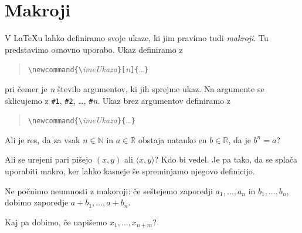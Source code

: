 \documentclass{amsart}
\begin{document}
\section{Makroji}
\label{sec:makroji}

V {\LaTeX}u lahko definiramo svoje ukaze, ki jim pravimo tudi \emph{makroji}. Tu
predstavimo osnovno uporabo. Ukaz definiramo z
%
\begin{quote}
  \verb|\newcommand{\|\emph{imeUkaza}\verb|}[|\emph{n}\verb|]{|\dots\verb|}|
\end{quote}
%
pri čemer je \emph{n} število argumentov, ki jih sprejme ukaz. Na argumente se sklicujemo
z \verb|#1|, \verb|#2|, \dots, \verb|#|\emph{n}. Ukaz brez argumentov definiramo z
%
\begin{quote}
  \verb|\newcommand{\|\emph{imeUkaza}\verb|}{|\dots\verb|}|
\end{quote}
%


\newcommand{\RR}{\mathbb{R}} %
\newcommand{\NN}{\mathbb{N}} %

Ali je res, da za vsak $n \in \NN$ in $a \in \RR$ obstaja natanko en $b \in \RR$, da je $b^n = a$?

\newcommand{\pair}[1]{\langle #1 \rangle}

Ali se urejeni pari pišejo $(x, y)$ ali $\pair{x, y}$? Kdo bi vedel. Je pa tako, da se
splača uporabiti makro, ker lahko kasneje še spreminjamo njegovo definicijo.

\newcommand{\zap}[2]{#1_1, \ldots, #1_{#2}}

Ne počnimo neumnosti z makoroji: če seštejemo zaporedji $\zap{a}{n}$ in $\zap{b}{n}$,
dobimo zaporedje $\zap{a + b}{n}$.

Kaj pa dobimo, če napišemo $\zap{x}{n + m}$?


\end{document}
